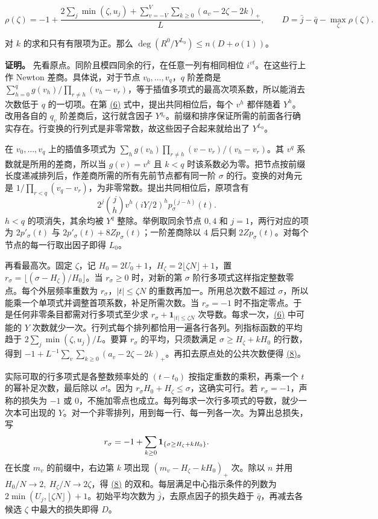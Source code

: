 \documentclass[11pt,a4paper]{article}
\begin{document}
\[
 \rho(\zeta)=-1+\frac{2\sum_j\min(\zeta,u_j)+
                   \sum_{v=-V}^{V}\sum_{k\ge0}(a_v-2\zeta-2k)_+}{L},
 \qquad D=\bar j-\bar q-\max_\zeta\rho(\zeta).                             \tag{8}\label{eq:8}
\]

对 \(k\) 的求和只有有限项为正。那么 \(\deg(R^0/Y^{L_0})\le n(D+o(1))\)。

\textbf{证明。} 先看原点。同阶且模四同余的行，在任意一列有相同相位 \(i^{vt}\)。在这些行上作 Newton 差商。具体说，对于节点 \(v_0,\ldots,v_q\)，\(q\) 阶差商是 \(\sum_{h=0}^qg(v_h)/\prod_{r\ne h}(v_h-v_r)\)，等于插值多项式的最高次项系数，所以能消去次数低于 \(q\) 的一切项。在第 \hyperref[eq:6]{(6)} 式中，提出共同相位后，每个 \(v^h\) 都伴随着 \(Y^h\)。改用各自的 \(q_v\) 阶差商后，这行就含因子 \(Y^{q_v}\)。前缀和排序保证所需的前面各行确实存在。行变换的行列式是非零常数，故这些因子合起来就给出了 \(Y^{L_0}\)。

在 \(v_0,\ldots,v_q\) 上的插值多项式为 \(\sum_h g(v_h)\prod_{r\ne h}(v-v_r)/(v_h-v_r)\)。其 \(v^q\) 系数就是所用的差商，所以当 \(g(v)=v^k\) 且 \(k<q\) 时该系数必为零。把节点按前缀长度递减排列后，作差商所需的所有先前节点都有同一阶 \(\sigma\) 的行。变换的对角元是 \(1/\prod_{r<q}(v_q-v_r)\)，为非零常数。提出共同相位后，原项含有 \[
 2^j\binom jh v^h(iY/2)^h p_\sigma^{(j-h)}(t).
\] \(h<q\) 的项消失，其余均被 \(Y^q\) 整除。举例取同余节点 \(0,4\) 和 \(j=1\)，两行对应的项为 \(2p'_\sigma(t)\) 与 \(2p'_\sigma(t)+8Zp_\sigma(t)\)；一阶差商除以 \(4\) 后只剩 \(2Zp_\sigma(t)\)。对每个节点的每一行取出因子即得 \(L_0\)。

再看最高次。固定 \(\zeta\)，记 \(H_0=2U_0+1\)，\(H_\zeta=2\lfloor\zeta N\rfloor+1\)，置 \(r_\sigma=\lfloor(\sigma-H_\zeta)/H_0\rfloor\)。当 \(r_\sigma\ge0\) 时，对新的第 \(\sigma\) 阶行多项式这样指定整数零点。每个外层频率重数为 \(r_\sigma\)，\(|t|\le\zeta N\) 的重数再加一。所用总次数不超过 \(\sigma\)，所以能乘一个单项式并调整首项系数，补足所需次数。当 \(r_\sigma=-1\) 时不指定零点。于是任何非零条目都需对行多项式至少求 \(r_\sigma+\mathbf1_{|t|\le\zeta N}\) 次导数。每求一次，\hyperref[eq:6]{(6)} 中可能的 \(Y\) 次数就少一次。行列式每个排列都恰用一遍各行各列。列指标函数的平均趋于 \(2\sum_j\min(\zeta,u_j)/L\)。要算 \(r_\sigma\) 的平均，只须数满足 \(\sigma\ge H_\zeta+kH_0\) 的行数，得到 \(-1+L^{-1}\sum_v\sum_{k\ge0}(a_v-2\zeta-2k)_+\)。再扣去原点处的公共次数便得 \hyperref[eq:8]{(8)}。

实际可取的行多项式是各整数频率处的 \((t-t_0)\) 按指定重数的乘积，再乘一个 \(t\) 的幂补足次数，最后除以 \(\sigma!\)。因为 \(r_\sigma H_0+H_\zeta\le\sigma\)，这确实可行。若 \(r_\sigma=-1\)，声称的损失为 \(-1\) 或 \(0\)，不施加零点也成立。每列每求一次行多项式的导数，就少一次本可出现的 \(Y\)。对一个非零排列，用到每一行、每一列各一次。为算出总损失，写 \[
 r_\sigma=-1+\sum_{k\ge0}{\bf1}_{\{\sigma\ge H_\zeta+kH_0\}}.
\] 在长度 \(m_v\) 的前缀中，右边第 \(k\) 项出现 \((m_v-H_\zeta-kH_0)_+\) 次。除以 \(n\) 并用 \(H_0/N\to2,\ H_\zeta/N\to2\zeta\)，得 \hyperref[eq:8]{(8)} 的双和。每层满足中心指示条件的列数为 \(2\min(U_j,\lfloor\zeta N\rfloor)+1\)。初始平均次数为 \(\bar j\)，去原点因子的损失趋于 \(\bar q\)，再减去各候选 \(\zeta\) 中最大的损失即得 \(D\)。
\end{document}
